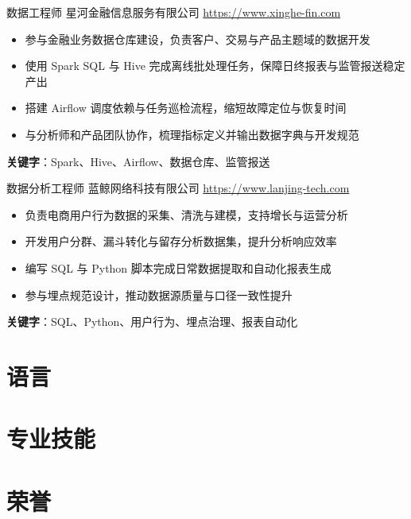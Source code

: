 \documentclass[a4paper, serif, 10pt]{moderncv}
\begin{document}
        {数据工程师}
        {星河金融信息服务有限公司}
        {\url{https://www.xinghe-fin.com}}
        {}
        {\begin{itemize}
\item 参与金融业务数据仓库建设，负责客户、交易与产品主题域的数据开发
\item 使用 Spark SQL 与 Hive 完成离线批处理任务，保障日终报表与监管报送稳定产出
\item 搭建 Airflow 调度依赖与任务巡检流程，缩短故障定位与恢复时间
\item 与分析师和产品团队协作，梳理指标定义并输出数据字典与开发规范
\end{itemize}
\textbf{关键字}：Spark、Hive、Airflow、数据仓库、监管报送}

        {数据分析工程师}
        {蓝鲸网络科技有限公司}
        {\url{https://www.lanjing-tech.com}}
        {}
        {\begin{itemize}
\item 负责电商用户行为数据的采集、清洗与建模，支持增长与运营分析
\item 开发用户分群、漏斗转化与留存分析数据集，提升分析响应效率
\item 编写 SQL 与 Python 脚本完成日常数据提取和自动化报表生成
\item 参与埋点规范设计，推动数据源质量与口径一致性提升
\end{itemize}
\textbf{关键字}：SQL、Python、用户行为、埋点治理、报表自动化}
\section{语言}

\section{专业技能}

\section{荣誉}
\end{document}
